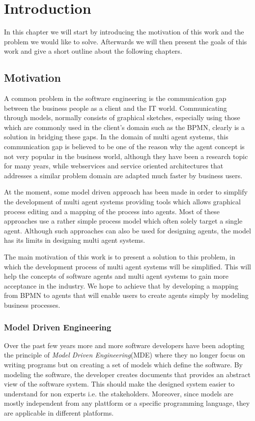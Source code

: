 \chapter{Introduction}

In this chapter we will start by introducing the motivation of this work and the problem we would like to solve. Afterwards we will then present the goals of this work and give a short outline about the following chapters.
\section{Motivation}
\label{sec:Motivation}
A common problem in the software engineering is the communication gap between the business people as a client and the IT world.  Communicating through models, normally consists of graphical sketches, especially using those which are commonly used in the client's domain such as the BPMN, clearly is a solution in bridging these gaps. In the domain of multi agent systems, this communication gap is believed to be one of the reason why the agent concept is not very popular in the business world, although they have been a research topic for many years, while webservices and service oriented architectures that addresses a similar problem domain are adapted much faster by business users.

At the moment, some model driven approach has been made in order to simplify the development of multi agent systems providing tools which allows graphical process editing and a mapping of the process into agents. Most of these approaches use a rather simple process model which often solely target a single agent. Although such approaches can also be used for designing agents, the model has its limits in designing multi agent systems. 
  
The main motivation of this work is to present a solution to this problem, in which the development process of multi agent systems will be simplified. This will help  the concepts of software agents and multi agent systems to gain more acceptance in the industry. We hope to achieve that by developing a mapping from BPMN to agents that will enable users to create agents simply by modeling business processes.\\

\subsection{Model Driven Engineering}
Over the past few years more and more software developers have been adopting the principle of \textit{Model Driven Engineering}(MDE) where 
they no longer focus on writing programs but on creating a set of models which define the software. By modeling the software, the developer creates documents that provides an abstract view of the software system. This should make the designed system easier to understand for non experts i.e. the stakeholders. Moreover, since models are mostly independent from any plattform or a specific programming language, they are applicable in different platforms. 

